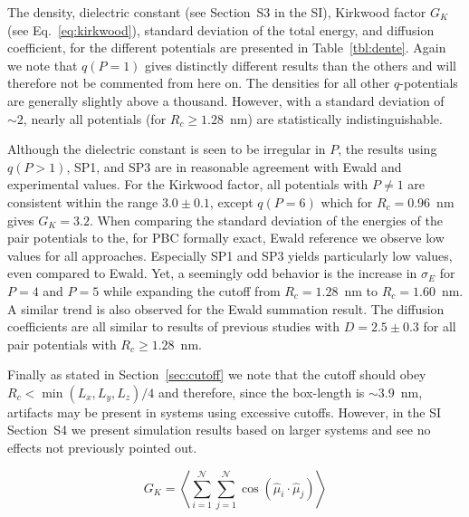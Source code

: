 \documentclass[
journal=jctcce,
manuscript=letter]{achemso}
\begin{document}
The density, dielectric constant (see Section~S3 in the SI), Kirkwood factor $G_K$ (see Eq.~\ref{eq:kirkwood}), standard deviation of the total energy, and diffusion coefficient, for the different potentials are presented in Table~\ref{tbl:dente}. Again we note that $q(P=1)$ gives distinctly different results than the others and will therefore not be commented from here on.
The densities for all other $q$-potentials are generally slightly above a thousand. However, with a standard deviation of $\sim 2$, nearly all potentials (for $R_c\ge 1.28$~nm) are statistically indistinguishable.

Although the dielectric constant is seen to be irregular in $P$, the results using $q(P>1)$, SP1, and SP3 are in reasonable agreement with Ewald and experimental values. For the Kirkwood factor, all potentials with $P\ne 1$ are consistent within the range $3.0\pm 0.1$, except $q(P=6)$ which for $R_c=0.96$~nm gives $G_K = 3.2$. When comparing the standard deviation of the energies of the pair potentials to the, for PBC formally exact, Ewald reference we observe low values for all approaches. Especially SP1 and SP3 yields particularly low values, even compared to Ewald. Yet, a seemingly odd behavior is the increase in $\sigma_E$ for $P=4$ and $P=5$ while expanding the cutoff from $R_c=1.28$~nm to $R_c=1.60$~nm. A similar trend is also observed for the Ewald summation result. The diffusion coefficients are all similar to results of previous studies\cite{Spoel1998systematic,Pekka2001Structure} with $D=2.5\pm 0.3$ for all pair potentials with $R_c\ge 1.28$~nm.

Finally as stated in Section~\ref{sec:cutoff} we note that the cutoff should obey $R_c<\min(L_x,L_y,L_z)/4$ and therefore, since the box-length is $\sim 3.9$~nm, artifacts may be present in systems using excessive cutoffs. However, in the SI Section~S4 we present simulation results based on larger systems and see no effects not previously pointed out.%

\begin{equation}
\label{eq:kirkwood}
    G_K = \left\langle \sum_{i=1}^{\mathcal{N}}\sum_{j=1}^{\mathcal{N}}\cos(  \hat{\mu}_i\cdot \hat{\mu}_j )\right\rangle
\end{equation}
\end{document}
